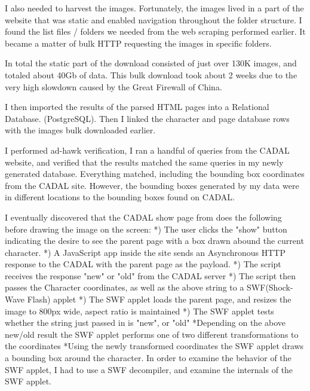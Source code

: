             I also needed to harvest the images.  Fortunately, the images lived in a part of the website that was static and enabled navigation throughout the folder structure.  I found the list files / folders we needed from the web scraping performed earlier.  It became a matter of bulk HTTP requesting the images in specific folders.
            
            In total the static part of the download consisted of just over 130K images, and totaled about 40Gb of data.  This bulk download took about 2 weeks due to the very high slowdown caused by the Great Firewall of China.
            
            I then imported the results of the parsed HTML pages into a Relational Database. (PostgreSQL).  Then I linked the character and page database rows with the images bulk downloaded earlier.
            
            I performed ad-hawk verification, I ran a handful of queries from the CADAL website, and verified that the results matched the same queries in my newly generated database.   Everything matched, including the bounding box coordinates from the CADAL site.  However, the bounding boxes generated by my data were in different locations to the bounding boxes found on CADAL.
            
            
            I eventually discovered that the CADAL show page from does the following before drawing the image on the screen:
                *) The user clicks the "show" button indicating the desire to see the parent page with a box drawn abound the current character.
                *) A JavaScript app inside the site sends an Asynchronous HTTP response to the CADAL with the parent page as the payload.
                *) The script receives the response "new" or "old" from the CADAL server
                *) The script then passes the Character coordinates, as well as the above string to a SWF(Shock-Wave Flash) applet
                *) The SWF applet loads the parent page, and resizes the image to 800px wide, aspect ratio is maintained
                *) The SWF applet tests whether the string just passed in is "new", or "old"
                    *Depending on the above new/old result the SWF applet performs one of two different transformations to the coordinates
                    *Using the newly transformed coordinates the SWF applet draws a bounding box around the character.
                In order to examine the behavior of the SWF applet, I had to use a SWF decompiler, and examine the internals of the SWF applet.
            
